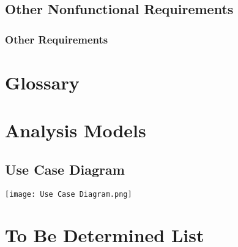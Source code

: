\documentclass{article}
\begin{document}
\subsection{Other Nonfunctional Requirements}








\subsubsection{Other Requirements}

\newpage
\appendix


\section{Glossary}




\newpage
\section{Analysis Models}
\subsection{Use Case Diagram}
\texttt{[image: Use Case Diagram.png]}

\newpage
\section{To Be Determined List}
\end{document}
